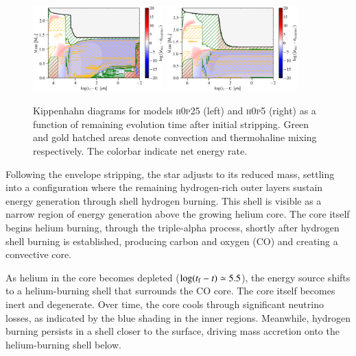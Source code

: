 \documentclass[main.tex]{subfiles}
\begin{document}
    \begin{figure}
        \centering
        \includegraphics[width=0.45\textwidth]{figures/chapter3/kipp_H0p25.png}
        \hspace{0.5cm}
        \includegraphics[width=0.45\textwidth]{figures/chapter3/kipp_H0p5.png}
        \caption{Kippenhahn diagrams for models \textsc{h0p25} (left) and \textsc{h0p5} (right) as a function of remaining evolution time after initial stripping. Green and gold hatched areas denote convection and thermohaline mixing respectively. The colorbar indicate net energy rate.}
        \label{fig:kipp_plots}
    \end{figure}
    
    Following the envelope stripping, the star adjusts to its reduced mass, settling into a configuration where the remaining hydrogen-rich outer layers sustain energy generation through shell hydrogen burning. This shell is visible as a narrow region of energy generation above the growing helium core. The core itself begins helium burning, through the triple-alpha process, shortly after hydrogen shell burning is established, producing carbon and oxygen (CO) and creating a convective core. 
    
    As helium in the core becomes depleted ($\log(t_{\rm f} - t) \simeq 5.5$), the energy source shifts to a helium-burning shell that surrounds the CO core. The core itself becomes inert and degenerate. Over time, the core cools through significant neutrino losses, as indicated by the blue shading in the inner regions. Meanwhile, hydrogen burning persists in a shell closer to the surface, driving mass accretion onto the helium-burning shell below.
    
\end{document}
